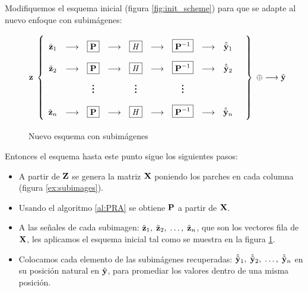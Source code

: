 Modifiquemos el esquema inicial (figura \ref{fig:init_scheme}) para que se adapte al nuevo enfoque con subim\'agenes:

\begin{figure}[h]
	\begin{equation*}
		\z\;\left\{
		\def\arraystretch{2.2}
		\begin{array}{ccccccccccc}
			\ztilde_1 & \longrightarrow & \boxed{\P} & \longrightarrow & \boxed{\H} & \longrightarrow & \boxed{\P^{-1}} & \longrightarrow & \yhattilde_1\\
			\ztilde_2 & \longrightarrow & \boxed{\P} & \longrightarrow & \boxed{\H} & \longrightarrow & \boxed{\P^{-1}} & \longrightarrow & \yhattilde_2\\
			& & \huge\vdots &  & \huge\vdots &  & \huge\vdots & & & \\
			\ztilde_n & \longrightarrow & \boxed{\P} & \longrightarrow & \boxed{\H} & \longrightarrow & \boxed{\P^{-1}} & \longrightarrow & \yhattilde_n\\
		\end{array}
		\right\}\;\oplus\longrightarrow\yhat
	\end{equation*}
	\caption{Nuevo esquema con subim\'agenes}
	\label{fig:subimage_scheme}
\end{figure}

Entonces el esquema hasta este punto sigue los siguientes pasos:

\begin{itemize}
	\item A partir de $\Z$ se genera la matriz $\X$ poniendo los parches en cada columna (figura \ref{ex:subimages}).
	\item Usando el algoritmo \ref{al:PRA} se obtiene $\P$ a partir de $\X$.
	\item A las señales de cada subimagen: $\ztilde_1,\; \ztilde_2,\; \dots,\; \ztilde_n$, que son los vectores fila de $\X$, les aplicamos el esquema inicial tal como se muestra en la figura \ref{fig:subimage_scheme}.
	\item Colocamos cada elemento de las subim\'agenes recuperadas: $\yhattilde_1,\; \yhattilde_2,\; \dots,\; \yhattilde_n$ en su posici\'on natural en $\yhat$, para promediar los valores dentro de una misma posici\'on.
\end{itemize}

